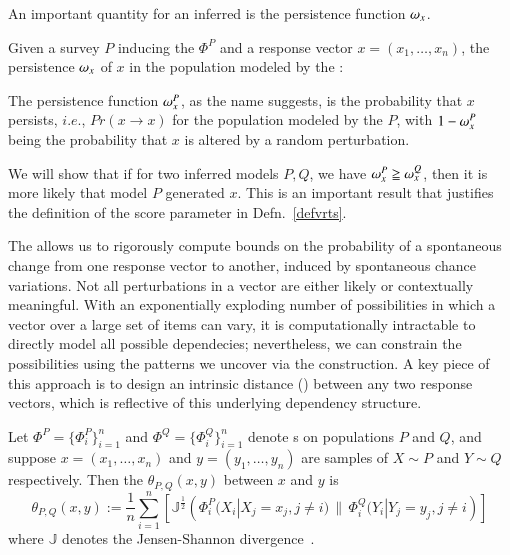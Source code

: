 \documentclass[onecolumn,10pt]{IEEEtran}
\def\x{x}
\def\y{y}
\begin{document}
An important quantity for an inferred \qnet is the persistence function $\mem{\x}$.
% 
\begin{defn}\label{def:mem}
  Given a survey $P$ inducing the \qnet $\Phi^P$ and a response  vector $\x = (x_1, \ldots, x_n)$, the persistence $\mem{\x}$ of  $\x$ in the population modeled  by the \qnet:
  \cgather{
    \mem{\x}^P := \operatorname{Pr}(\x \in P) = \prod_{i=1}^n  \Phi^P_i(X_i = x_i\,|\,X_j = x_j, j \neq i) %
  }%
\end{defn}
The persistence function $\mem{\x}^P$, as the name suggests,  is the probability that $\x$ persists, $i.e.$,  $Pr(\x \rightarrow \x)$ for the population modeled by the \qnet $P$, with $1-\mem{\x}^P$ being the probability that $\x$ is altered by a  random perturbation.

We will show  that if for two inferred \qnet models $P,Q$, we have $\mem{\x}^P \geqq \mem{\x}^Q$, then it is more likely that model $P$ generated $\x$. This is an important result that justifies the definition of the
score parameter in Defn.~\ref{defvrts}.

The \qnet allows us to rigorously compute  bounds on  the probability of a spontaneous change from one response vector to another, induced by spontaneous chance variations. Not all perturbations in a vector are either likely or contextually meaningful. With an exponentially exploding number of possibilities in which a vector over a large set of items can vary, it is computationally intractable to directly model all possible dependecies; nevertheless, we can constrain the possibilities using the patterns we uncover via the \qnet construction.  A key piece of this approach is to design  an intrinsic distance (\qdist) between any two response vectors, which is reflective of this underlying  dependency structure.  

\begin{defn}[\qdist]
  \label{defqdistance} 
  Let $\Phi^P = \{\Phi_i^P\}_{i=1}^n$ and $\Phi^Q = \{\Phi_i^Q\}_{i=1}^n$ denote {\qnet}s on populations $P$ and $Q$, and suppose $\x=(x_1, \ldots, x_n)$ and $\y =(y_1, \ldots, y_n)$ are samples of $X \sim P$ and $Y \sim Q$ respectively. Then the \qdist $\theta_{P,Q}(\x,\y)$ between $\x$ and $\y$ is\[\theta_{P,Q}(\x,\y) := \frac{1}{n}\sum_{i=1}^n \left[ \mathbb{J}^{\frac{1}{2}} \left(\Phi_i^P(X_i |X_j = x_j, j \neq i) \,\|\, \Phi_i^Q(Y_i|Y_j = y_j, j \neq i\right ) \right]\]%
  where $\mathbb{J}$ denotes the Jensen-Shannon divergence~\cite{cover}.
\end{defn}
\end{document}

